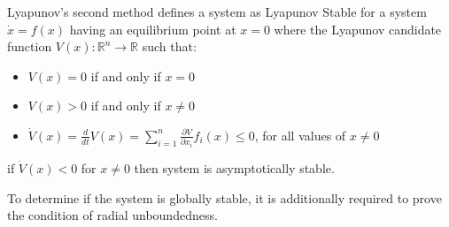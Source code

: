 Lyapunov's second method defines a system as Lyapunov Stable for a system $\dot{x}=f(x)$ having an equilibrium point at $x=0$ where the Lyapunov candidate function $V(x):\mathbb{R}^n \rightarrow \mathbb{R}$ such that:
\begin{itemize}
	\item $V(x)=0$ if and only if $x=0$
	\item $V(x)>0$ if and only if $x\neq0$
	\item $\dot{V}(x)=\frac{d}{dt}V(x)=\sum\limits_{i=1}^{n} \frac{\partial V}{\partial x_i}f_i(x) \leq 0$, for all values of $x\neq 0$		
\end{itemize}

if $\dot{V}(x) < 0$ for $x\neq 0$ then system is asymptotically stable.

To determine if the system is globally stable, it is additionally required to prove the condition of radial unboundedness.















